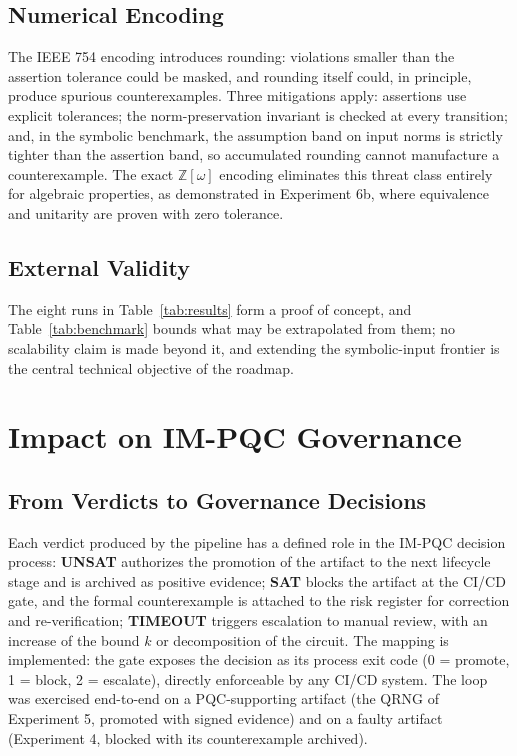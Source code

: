 \documentclass[journal]{IEEEtran} %
\begin{document}
\subsection{Numerical Encoding}
The IEEE 754 encoding introduces rounding: violations smaller than the assertion tolerance could be masked, and rounding itself could, in principle, produce spurious counterexamples. Three mitigations apply: assertions use explicit tolerances; the norm-preservation invariant is checked at every transition; and, in the symbolic benchmark, the assumption band on input norms is strictly tighter than the assertion band, so accumulated rounding cannot manufacture a counterexample. The exact $\mathbb{Z}[\omega]$ encoding eliminates this threat class entirely for algebraic properties, as demonstrated in Experiment 6b, where equivalence and unitarity are proven with zero tolerance.

\subsection{External Validity}
The eight runs in Table~\ref{tab:results} form a proof of concept, and Table~\ref{tab:benchmark} bounds what may be extrapolated from them; no scalability claim is made beyond it, and extending the symbolic-input frontier is the central technical objective of the roadmap.

\section{Impact on IM-PQC Governance}
\label{sec:governance}
\subsection{From Verdicts to Governance Decisions}
Each verdict produced by the pipeline has a defined role in the IM-PQC decision process: \textbf{UNSAT} authorizes the promotion of the artifact to the next lifecycle stage and is archived as positive evidence; \textbf{SAT} blocks the artifact at the CI/CD gate, and the formal counterexample is attached to the risk register for correction and re-verification; \textbf{TIMEOUT} triggers escalation to manual review, with an increase of the bound $k$ or decomposition of the circuit. The mapping is implemented: the gate exposes the decision as its process exit code (0 = promote, 1 = block, 2 = escalate), directly enforceable by any CI/CD system. The loop was exercised end-to-end on a PQC-supporting artifact (the QRNG of Experiment 5, promoted with signed evidence) and on a faulty artifact (Experiment 4, blocked with its counterexample archived).
\end{document}
